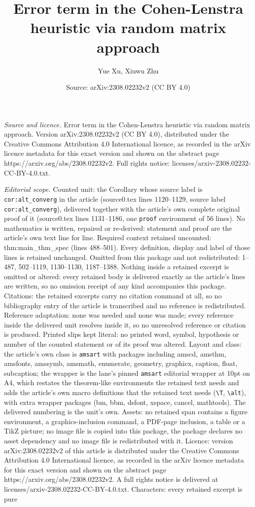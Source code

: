 \documentclass[10pt,a4paper]{amsart}
\title[Error term in the Cohen-Lenstra heuristic via random matrix ]{Error term in the Cohen-Lenstra heuristic via random matrix approach}
\author{Yue Xu, Xiuwu Zhu}
\date{Source: arXiv:2308.02232v2 (CC BY 4.0)}
\begin{document}
\maketitle

\noindent\emph{Source and licence.} Error term in the Cohen-Lenstra heuristic via random matrix approach. Version arXiv:2308.02232v2 (CC BY 4.0), distributed under the Creative Commons Attribution 4.0 International licence, as recorded in the arXiv licence metadata for this exact version and shown on the abstract page https://arxiv.org/abs/2308.02232v2. Full rights notice: licenses/arxiv-2308.02232-CC-BY-4.0.txt.\par\smallskip

\noindent\textit{Editorial scope.} Counted unit: the Corollary whose source label is \texttt{cor:alt\_converg} in the article (source0.tex lines 1120--1129, source label \texttt{cor:alt\_converg}), delivered together with the article's own complete original proof of it (source0.tex lines 1131--1186, one \texttt{proof} environment of 56 lines). No mathematics is written, repaired or re-derived: statement and proof are the article's own text line for line. Required context retained uncounted: thm:main\_thm\_spec (lines 488--501). Every definition, display and label of those lines is retained unchanged. Omitted from this package and not redistributed: 1--487, 502--1119, 1130--1130, 1187--1388. Nothing inside a retained excerpt is omitted or altered: every retained body is delivered exactly as the article's lines are written, so no omission receipt of any kind accompanies this package. Citations: the retained excerpts carry no citation command at all, so no bibliography entry of the article is transcribed and no reference is redistributed. Reference adaptation: none was needed and none was made; every reference inside the delivered unit resolves inside it, so no unresolved reference or citation is produced. Printed slips kept literal: no printed word, symbol, hypothesis or number of the counted statement or of its proof was altered. Layout and class: the article's own class is \texttt{amsart} with packages including amscd, amsthm, amsfonts, amssymb, amsmath, enumerate, geometry, graphicx, caption, float, subcaption; the wrapper is the lane's pinned \texttt{amsart} editorial wrapper at 10pt on A4, which restates the theorem-like environments the retained text needs and adds the article's own macro definitions that the retained text needs (\texttt{\textbackslash T}, \texttt{\textbackslash alt}), with extra wrapper packages (bm, bbm, dsfont, xspace, cancel, mathtools). The delivered numbering is the unit's own. Assets: no retained span contains a figure environment, a graphics-inclusion command, a PDF-page inclusion, a table or a TikZ picture; no image file is copied into this package, the package declares no asset dependency and no image file is redistributed with it. Licence: version arXiv:2308.02232v2 of this article is distributed under the Creative Commons Attribution 4.0 International licence, as recorded in the arXiv licence metadata for this exact version and shown on the abstract page https://arxiv.org/abs/2308.02232v2. A full rights notice is delivered at licenses/arxiv-2308.02232-CC-BY-4.0.txt. Characters: every retained excerpt is pure 
\end{document}
